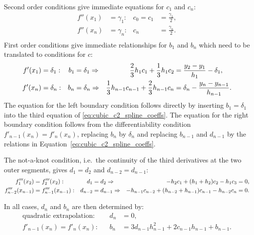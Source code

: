 Second order conditions give immediate equations for $c_1$ and $c_n$:
\begin{equation*}
\begin{aligned}
    f''(x_1)&=\gamma_1: & c_0=c_1 & = \frac{\gamma_1}{2},\\
    f''(x_n)&=\gamma_n: & c_n & = \frac{\gamma_n}{2}.\\
\end{aligned}
\end{equation*}
First order conditions give immediate relationships for $b_1$ and $b_n$
which need to be translated to conditions for $c$:
\begin{equation*}
\begin{aligned}
    f'(x_1)&=\delta_1: & b_1&=\delta_1 \Rightarrow&
        \frac{2}{3}h_1 c_1 +\frac{1}{3}h_1 c_2
        & = \frac{y_2-y_1}{h_1} -\delta_1,\\
    f'(x_n)&=\delta_n: & b_n&=\delta_n \Rightarrow&
        \frac{1}{3}h_{n-1} c_{n-1} +\frac{2}{3}h_{n-1} c_n
        & = \delta_n - \frac{y_n-y_{n-1}}{h_{n-1}}.\\
\end{aligned}
\end{equation*}
The equation for the left boundary condition follows directly by inserting
$b_1=\delta_1$ into the third equation of \eqref{eq:cubic_c2_spline_coeffs}.
The equation for the right boundary condition follows from the
differentiability condition $f'_{n-1}(x_n)  = f'_n(x_n)$, replacing
$b_n$ by $\delta_n$ and replacing $b_{n-1}$ and $d_{n-1}$ by the relations
in Equation~\eqref{eq:cubic_c2_spline_coeffs}.

The not-a-knot condition, i.e.\ the continuity of the third derivatives
at the two outer segments, gives $d_1=d_2$ and $d_{n-2}=d_{n-1}$:
\begin{equation*}
\begin{aligned}
    f_1'''(x_2)&=f_2'''(x_2): & d_1&=d_2 \Rightarrow&
    -h_2 c_1 + (h_1+h_2) c_2 - h_1 c_3 & = 0,\\
    f_{n-2}'''(x_{n-1})&=f_{n-1}'''(x_{n-1}): & d_{n-2}&=d_{n-1}\Rightarrow&
    -h_{n-1} c_{n-2} + (h_{n-2}+h_{n-1}) c_{n-1} - h_{n-2} c_n & = 0.
\end{aligned}
\end{equation*}



In all cases, $d_n$ and $b_n$ are then determined by:
\begin{equation*}
\begin{aligned}
    \text{quadratic extrapolation:} & & d_n & = 0,\\
    f'_{n-1}(x_n)  = f'_n(x_n): & & b_n & = 3 d_{n-1} h_{n-1}^2 + 2 c_{n-1} h_{n-1} + b_{n-1}.
\end{aligned}
\end{equation*}



